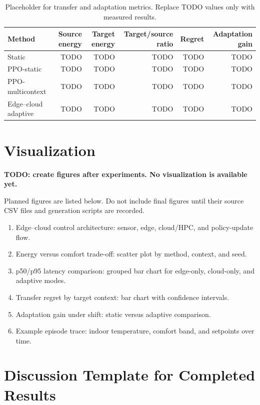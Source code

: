 \documentclass[11pt,a4paper]{article}
\begin{document}
\begin{table}[ht]
\centering
\caption{Placeholder for transfer and adaptation metrics. Replace TODO values only with measured results.}
\label{tab:transfer-results}
\begin{tabular}{lrrrrr}
\toprule
Method & Source energy & Target energy & Target/source ratio & Regret & Adaptation gain \\
\midrule
Static & TODO & TODO & TODO & TODO & TODO \\
PPO-static & TODO & TODO & TODO & TODO & TODO \\
PPO-multicontext & TODO & TODO & TODO & TODO & TODO \\
Edge--cloud adaptive & TODO & TODO & TODO & TODO & TODO \\
\bottomrule
\end{tabular}
\end{table}

\section{Visualization}
\label{sec:visualization}

\textbf{TODO: create figures after experiments. No visualization is available yet.}

Planned figures are listed below. Do not include final figures until their source CSV files and generation scripts are recorded.

\begin{enumerate}
  \item Edge--cloud control architecture: sensor, edge, cloud/HPC, and policy-update flow.
  \item Energy versus comfort trade-off: scatter plot by method, context, and seed.
  \item p50/p95 latency comparison: grouped bar chart for edge-only, cloud-only, and adaptive modes.
  \item Transfer regret by target context: bar chart with confidence intervals.
  \item Adaptation gain under shift: static versus adaptive comparison.
  \item Example episode trace: indoor temperature, comfort band, and setpoints over time.
\end{enumerate}

\section{Discussion Template for Completed Results}
\end{document}
